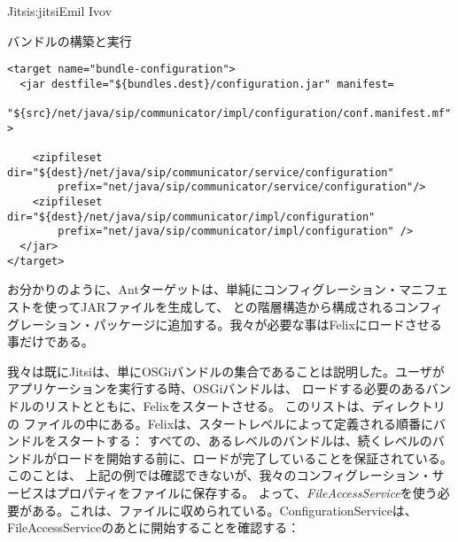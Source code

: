 \begin{aosachapter}{Jitsi}{s:jitsi}{Emil Ivov}
\begin{aosasect1}{バンドルの構築と実行}
\begin{verbatim}
<target name="bundle-configuration">
  <jar destfile="${bundles.dest}/configuration.jar" manifest=
    "${src}/net/java/sip/communicator/impl/configuration/conf.manifest.mf" >

    <zipfileset dir="${dest}/net/java/sip/communicator/service/configuration"
        prefix="net/java/sip/communicator/service/configuration"/>
    <zipfileset dir="${dest}/net/java/sip/communicator/impl/configuration"
        prefix="net/java/sip/communicator/impl/configuration" />
  </jar>
</target>
\end{verbatim}

お分かりのように、Antターゲットは、単純にコンフィグレーション・マニフェストを使ってJARファイルを生成して、
との階層構造から構成されるコンフィグレーション・パッケージに追加する。我々が必要な事はFelixにロードさせる事だけである。

我々は既にJitsiは、単にOSGiバンドルの集合であることは説明した。ユーザがアプリケーションを実行する時、OSGiバンドルは、
ロードする必要のあるバンドルのリストとともに、Felixをスタートさせる。 このリストは、ディレクトリの
ファイルの中にある。Felixは、スタートレベルによって定義される順番にバンドルをスタートする：
すべての、あるレベルのバンドルは、続くレベルのバンドルがロードを開始する前に、ロードが完了していることを保証されている。このことは、
上記の例では確認できないが、我々のコンフィグレーション・サービスはプロパティをファイルに保存する。
よって、\emph{FileAccessService}を使う必要がある。これは、ファイルに収められている。ConfigurationServiceは、
FileAccessServiceのあとに開始することを確認する：


\end{aosasect1}
\end{aosachapter}
